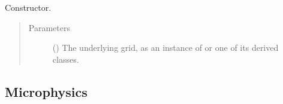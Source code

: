 \documentclass[letterpaper,10pt,english]{sphinxmanual}
\begin{document}
\begin{fulllineitems}
\begin{fulllineitems}
\begin{quote}
\begin{description}
\begin{itemize}
\end{itemize}


\end{description}\end{quote}

\end{fulllineitems}


\begin{fulllineitems}
\label{\detokenize{api:parameterizations.tendency.Tendency.__init__}}
Constructor.
\begin{quote}\begin{description}
\item[{Parameters}] \leavevmode
{} () \textendash{} The underlying grid, as an instance of {\hyperref[\detokenize{api:grids.grid_xyz.GridXYZ}]{}} or one of its derived classes.

\end{description}\end{quote}

\end{fulllineitems}


\end{fulllineitems}



\subsection{Microphysics}
\label{\detokenize{api:microphysics}}
\end{document}
